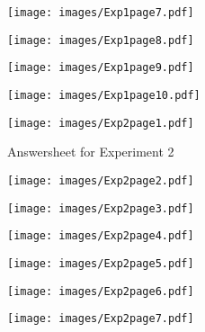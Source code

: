 \begin{figure}[htbp]
	\centering
		\texttt{[image: images/Exp1page7.pdf]}
	\label{x1p7}
\end{figure}

\begin{figure}[htbp]
	\centering
		\texttt{[image: images/Exp1page8.pdf]}
		\label{x1p8}
\end{figure}

\begin{figure}[htbp]
	\centering
		\texttt{[image: images/Exp1page9.pdf]}
		\label{x1p9}
\end{figure}

\begin{figure}[htbp]
	\centering
		\texttt{[image: images/Exp1page10.pdf]}
		\label{x1p10}
\end{figure}


\clearpage
\begin{figure}[htbp]
	\centering
		\texttt{[image: images/Exp2page1.pdf]}
		\caption{Answersheet for Experiment 2}
		\label{x2p1}
\end{figure}

\begin{figure}
	\centering
		\texttt{[image: images/Exp2page2.pdf]}
			\label{x2p2}
\end{figure}

\begin{figure}
	\centering
		\texttt{[image: images/Exp2page3.pdf]}
			\label{x2p3}
\end{figure}

\begin{figure}
	\centering
		\texttt{[image: images/Exp2page4.pdf]}
			\label{x2p4}
\end{figure}

\begin{figure}
	\centering
		\texttt{[image: images/Exp2page5.pdf]}
			\label{x2p5}
\end{figure}

\begin{figure}
	\centering
		\texttt{[image: images/Exp2page6.pdf]}
			\label{x2p6}
\end{figure}

\begin{figure}
	\centering
		\texttt{[image: images/Exp2page7.pdf]}
			\label{x2p7}
\end{figure}



